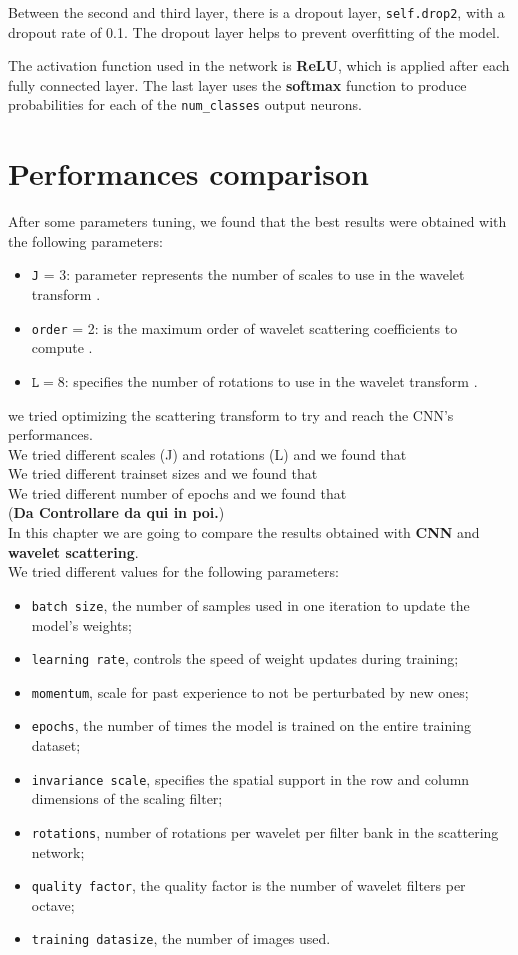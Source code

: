 \documentclass{report}
\begin{document}
Between the second and third layer, there is a dropout layer, \texttt{self.drop2}, with a dropout rate of 0.1. The dropout layer helps to prevent overfitting of the model.

The activation function used in the network is \textbf{ReLU}, which is applied after each fully connected layer. The last layer uses the \textbf{softmax} function to produce probabilities for each of the \texttt{num\_classes} output neurons. 

\chapter{Performances comparison}
After some parameters tuning, we found that the best results were obtained with the following parameters:
\begin{itemize}
    \item \texttt{J} = 3: parameter represents the number of scales to use in the wavelet transform .
    \item \texttt{order} = 2: is the maximum order of wavelet scattering coefficients to compute .
    \item $\texttt{L} = 8$: specifies the number of rotations to use in the wavelet transform .
\end{itemize}
we tried optimizing the scattering transform to try and reach the CNN's performances.\\
We tried different scales (J) and rotations (L) and we found that \\
We tried different trainset sizes and we found that \\
We tried different number of epochs and we found that \\
(\textbf{Da Controllare da qui in poi.})\\
In this chapter we are going to compare the results obtained with \textbf{CNN} and \textbf{wavelet scattering}.\\
We tried different values for the following parameters:
\begin{itemize}
    \item \texttt{batch size}, the number of samples used in one iteration to update the model's weights;
    \item \texttt{learning rate}, controls the speed of weight updates during training;
    \item \texttt{momentum}, scale for past experience to not be perturbated by new ones;
    \item \texttt{epochs}, the number of times the model is trained on the entire training dataset;
    \item \texttt{invariance scale}, specifies the spatial support in the row and column dimensions of the scaling filter;
    \item \texttt{rotations}, number of rotations per wavelet per filter bank in the scattering network;
    \item \texttt{quality factor}, the quality factor is the number of wavelet filters per octave;
    \item \texttt{training datasize}, the number of images used.
\end{itemize}
\end{document}
